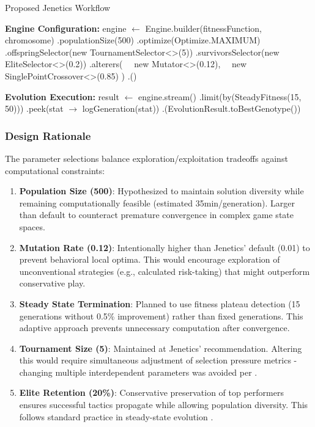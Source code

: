\documentclass[sigconf]{acmart} %
\begin{document}
\begin{algorithm}[t]
	\caption{Proposed Jenetics Workflow}
	\label{alg:jenetics_hypothetical}
	\DontPrintSemicolon
	
	\textbf{Engine Configuration:}\;
	engine $\leftarrow$ Engine.builder(fitnessFunction, chromosome)\;
	\nl.populationSize(500)          \;
	\nl.optimize(Optimize.MAXIMUM)   \;
	\nl.offspringSelector(new TournamentSelector<>(5))\;
	\nl.survivorsSelector(new EliteSelector<>(0.2))\;
	\nl.alterers(\;
	\nl\ \ new Mutator<>(0.12),      \;
	\nl\ \ new SinglePointCrossover<>(0.85)\;
	\nl )\;
	\nl.\Build()\;
	
	\BlankLine
	\textbf{Evolution Execution:}\;
	result $\leftarrow$ engine.stream()\;
	\nl.limit(by(SteadyFitness(15, 50))) \;
	\nl.peek(stat $\rightarrow$ logGeneration(stat)) \;
	\nl.\Collect(EvolutionResult.toBestGenotype())\;
\end{algorithm}

\subsubsection{Design Rationale}
The parameter selections balance exploration/exploitation tradeoffs against computational constraints:

\begin{enumerate}
	\item \textbf{Population Size (500)}: 
	Hypothesized to maintain solution diversity while remaining computationally feasible (estimated 35min/generation). Larger than default to counteract premature convergence in complex game state spaces.
	
	\item \textbf{Mutation Rate (0.12)}: 
	Intentionally higher than Jenetics' default (0.01) to prevent behavioral local optima. This would encourage exploration of unconventional strategies (e.g., calculated risk-taking) that might outperform conservative play.
	
	\item \textbf{Steady State Termination}:
	Planned to use fitness plateau detection (15 generations without 0.5\% improvement) rather than fixed generations. This adaptive approach prevents unnecessary computation after convergence.
	
	\item \textbf{Tournament Size (5)}: 
	Maintained at Jenetics' recommendation. Altering this would require simultaneous adjustment of selection pressure metrics - changing multiple interdependent parameters was avoided per \cite{back2000evolutionary}.
	
	\item \textbf{Elite Retention (20\%)}: 
	Conservative preservation of top performers ensures successful tactics propagate while allowing population diversity. This follows standard practice in steady-state evolution \cite{dejong2006evolutionary}.
\end{enumerate}
\end{document}
